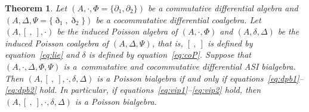 \documentclass[10pt,a4paper]{amsart}
\numberwithin{equation}{section}
\newtheorem{Theorem}{Theorem}[section]
\begin{document}
\begin{Theorem}\label{thm:asspoibi}
 Let $(A,\cdot, \Phi = \{\partial_1, \partial_2\})$ be a commutative differential algebra and $(A, \Delta, \Psi = \{\eth_1, \eth_2\})$ be a cocommutative differential coalgebra.
 Let $(A, [\ ,\ ], \cdot)$ be the induced Poisson algebra of $(A,\cdot, \Phi)$ and $(A, \delta, \Delta)$ be the induced Poisson coalgebra of $(A, \Delta, \Psi)$,
 that is, $[\ ,\ ]$ is defined by equation~\eqref{eq:lie} and $\delta$ is defined by equation~\eqref{eq:coP}.
 Suppose that $(A, \cdot, \Delta, \Phi, \Psi)$ is a~commutative and cocommutative differential ASI bialgebra.
 Then $(A, [\ ,\ ], \cdot, \delta, \Delta)$ is a Poisson bialgebra if and only if equations~\eqref{eq:dpb1}--\eqref{eq:dpb2} hold.
 In particular, if equations~\eqref{eq:vip1}--\eqref{eq:vip2} hold, then $(A, [\ ,\ ], \cdot, \delta, \Delta)$ is a Poisson bialgebra.
\end{Theorem}
\end{document}
